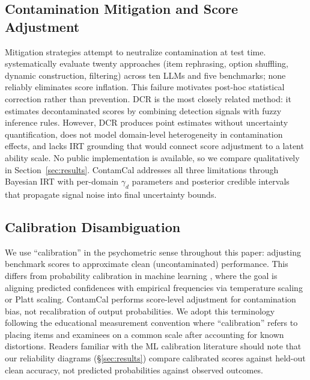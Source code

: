 \subsection{Contamination Mitigation and Score Adjustment}

Mitigation strategies attempt to neutralize contamination at test time. \citet{sun2025emperor} systematically evaluate twenty approaches (item rephrasing, option shuffling, dynamic construction, filtering) across ten LLMs and five benchmarks; none reliably eliminates score inflation. This failure motivates post-hoc statistical correction rather than prevention. DCR \citep{xu2025dcr} is the most closely related method: it estimates decontaminated scores by combining detection signals with fuzzy inference rules. However, DCR produces point estimates without uncertainty quantification, does not model domain-level heterogeneity in contamination effects, and lacks IRT grounding that would connect score adjustment to a latent ability scale. No public implementation is available, so we compare qualitatively in Section~\ref{sec:results}. ContamCal addresses all three limitations through Bayesian IRT with per-domain $\gamma_d$ parameters and posterior credible intervals that propagate signal noise into final uncertainty bounds.

\subsection{Calibration Disambiguation}

We use ``calibration'' in the psychometric sense throughout this paper: adjusting benchmark scores to approximate clean (uncontaminated) performance. This differs from probability calibration in machine learning \citep{guo_2017_calibration}, where the goal is aligning predicted confidences with empirical frequencies via temperature scaling or Platt scaling. ContamCal performs score-level adjustment for contamination bias, not recalibration of output probabilities. We adopt this terminology following the educational measurement convention where ``calibration'' refers to placing items and examinees on a common scale after accounting for known distortions. Readers familiar with the ML calibration literature should note that our reliability diagrams (\S\ref{sec:results}) compare calibrated scores against held-out clean accuracy, not predicted probabilities against observed outcomes.